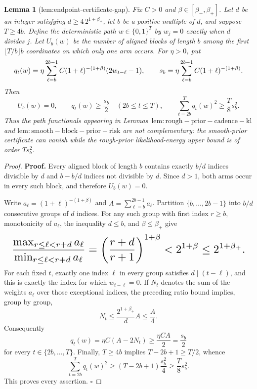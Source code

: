 \documentclass{article}
\newtheorem{lemma}{Lemma}
\begin{document}
\begin{lemma}[lem:endpoint-certificate-gap]\label{lem:endpoint-certificate-gap}
Fix \(C>0\) and \(\beta\in[\beta_-,\beta_+]\). Let \(d\) be an integer satisfying \(d\ge 4\,2^{1+\beta_+}\), let \(b\) be a positive multiple of \(d\), and suppose \(T\ge4b\). Define the deterministic path \(w\in\{0,1\}^T\) by \(w_j=0\) exactly when \(d\) divides \(j\). Let \(U_b(w)\) be the number of aligned blocks of length \(b\) among the first \(\lfloor T/b\rfloor b\) coordinates on which only one arm occurs. For \(\eta>0\), put \[
\makebox[\linewidth][c]{\resizebox{0.98\linewidth}{!}{\leavevmode\par\noindent \makebox[\linewidth][c]{\resizebox{0.98\linewidth}{!}{\(\displaystyle \displaystyle q_t(w)=\eta\sum_{\ell=b}^{2b-1}C(1+\ell)^{-(1+\beta)}(2w_{t-\ell}-1),\qquad s_b=\eta\sum_{\ell=b}^{2b-1}C(1+\ell)^{-(1+\beta)}.\)}}\par\noindent}}
\] Then \[U_b(w)=0,\qquad q_t(w)\ge\frac{s_b}{2}\quad(2b\le t\le T),\qquad \sum_{t=2b}^Tq_t(w)^2\ge\frac{T}{8}s_b^2.\] Thus the path functionals appearing in Lemmas~\(\mathrm{lem:rough-prior-cadence-kl}\) and \(\mathrm{lem:smooth-block-prior-risk}\) are not complementary: the smooth-prior certificate can vanish while the rough-prior likelihood-energy upper bound is of order \(Ts_b^2\).
\end{lemma}
\begin{proof}
\textbf{Proof.} Every aligned block of length \(b\) contains exactly \(b/d\) indices divisible by \(d\) and \(b-b/d\) indices not divisible by \(d\). Since \(d>1\), both arms occur in every such block, and therefore \(U_b(w)=0\).

Write \(a_\ell=(1+\ell)^{-(1+\beta)}\) and \(A=\sum_{\ell=b}^{2b-1}a_\ell\). Partition \(\{b,\ldots,2b-1\}\) into \(b/d\) consecutive groups of \(d\) indices. For any such group with first index \(r\ge b\), monotonicity of \(a_\ell\), the inequality \(d\le b\), and \(\beta\le\beta_+\) give
\[
\makebox[\linewidth][c]{\resizebox{0.98\linewidth}{!}{\(\displaystyle \frac{\max_{r\le\ell<r+d}a_\ell}{\min_{r\le\ell<r+d}a_\ell}
=\left(\frac{r+d}{r+1}\right)^{1+\beta}
<2^{1+\beta}
\le2^{1+\beta_+}.\)}}
\]
For each fixed \(t\), exactly one index \(\ell\) in every group satisfies \(d\mid(t-\ell)\), and this is exactly the index for which \(w_{t-\ell}=0\). If \(N_t\) denotes the sum of the weights \(a_\ell\) over those exceptional indices, the preceding ratio bound implies, group by group,
\[
N_t\le\frac{2^{1+\beta_+}}{d}A\le\frac A4.
\]
Consequently
\[
q_t(w)=\eta C\left(A-2N_t\right)\ge\frac{\eta C A}{2}=\frac{s_b}{2}
\]
for every \(t\in\{2b,\ldots,T\}\). Finally, \(T\ge4b\) implies \(T-2b+1\ge T/2\), whence
\[
\sum_{t=2b}^Tq_t(w)^2
\ge (T-2b+1)\frac{s_b^2}{4}
\ge\frac{T}{8}s_b^2.
\]
This proves every assertion. \(\square\)
\end{proof}
\end{document}
